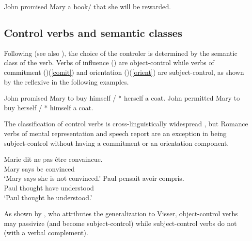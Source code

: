 \documentclass[output=paper]{langsci/langscibook}
\begin{document}
\begin{exe}
	\ex John promised Mary a book/ that she will be rewarded.
\end{exe}
 
\subsection{Control verbs and semantic classes}

Following \citet{PollardandSag1992} (see also \citealt{JackendoffandCulicover2003}), the choice of the controler is determined by the semantic class of the verb.  Verbs of influence () are object-control
while verbs of commitment ()(\ref{comit}) and orientation ()(\ref{orient}) are subject-control, as shown by the reflexive in the following examples.

\begin{exe}
	\ex \begin{xlist}
	\ex John promised Mary to buy himself / * herself a coat. \label{comit}
   \ex 	John permitted Mary to buy herself / * himself a coat.\label{orient}
 \end{xlist}
 \end{exe}
 
  The classification of control verbs is cross-linguistically widespread \citep{VanValinandLapolla1997}, but Romance verbs of mental representation and speech report are an exception in being subject-control without having a commitment or an orientation component.


\begin{exe}
\ex \begin{xlist}
\ex \gll Marie dit {ne pas} \^etre convaincue. \\
Mary says  be convinced \\
\glt `Mary says she is not convinced.'	
\ex \gll Paul pensait  avoir compris. \\
Paul thought have understood \\
\glt `Paul thought he understood.'
 \end{xlist}
\end{exe}

As shown by \citet{Bresnan1982}, who attributes the generalization to Visser, object-control verbs may passivize (and become subject-control) while   subject-control verbs do not (with a verbal complement).
\eal
{}
\zl
 
\end{document}
